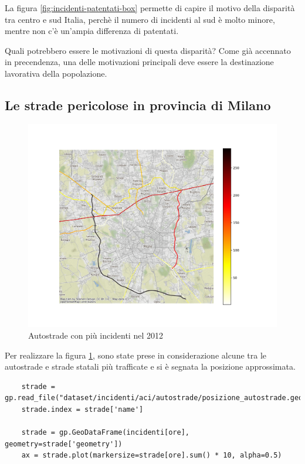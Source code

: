 \documentclass[a4paper]{report}
\begin{document}
La figura \ref{fig:incidenti-patentati-box} permette di capire il motivo della disparità 
tra centro e sud Italia, perchè il numero di incidenti al sud è molto minore, mentre 
non c'è un'ampia differenza di patentati. 

Quali potrebbero essere le motivazioni di questa disparità?
Come già accennato in precendenza, una delle motivazioni principali 
deve essere la destinazione lavorativa della popolazione.


\subsection{Le strade pericolose in provincia di Milano}

\begin{figure}
    \includegraphics[width=\linewidth]{../src/incidenti/incidenti_aci/autostrade/incidenti_line_chart.png}
    \caption{Autostrade con più incidenti nel 2012}
    \label{fig:line-incidenti-milano}
\end{figure}

Per realizzare la figura \ref{fig:line-incidenti-milano}, sono state prese in considerazione alcune 
tra le autostrade e strade statali più trafficate e si è segnata la posizione approssimata.

\begin{lstlisting}
    strade = gp.read_file("dataset/incidenti/aci/autostrade/posizione_autostrade.geojson").to_crs(epsg=3857)
    strade.index = strade['name']

    strade = gp.GeoDataFrame(incidenti[ore], geometry=strade['geometry'])
    ax = strade.plot(markersize=strade[ore].sum() * 10, alpha=0.5)
\end{lstlisting}
\end{document}
